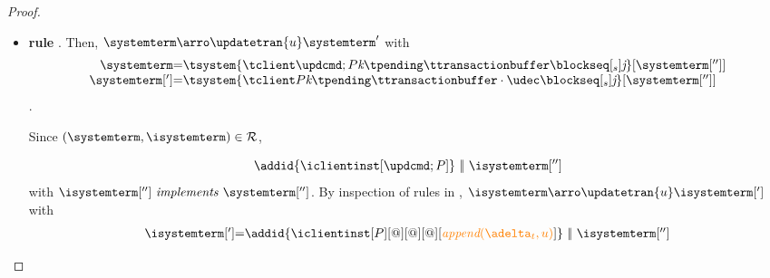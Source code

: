 \begin{proof}
\begin{itemize}
\begin{itemize}
\begin{enumerate}
						Then, we can build the following proof for 
						$\rvalue{r}{\flatten {\queuemessage[0..\tknown-1] \cdot \tpending} \cdot \ttransactionbuffer}
						= 
						\iapply{\known}{{\igetdeltas\pending}\cdot{\pushbuffer}\cdot{\transactionbuffer}}$
						\[
						  \mathrulean{\triangread}
						    {
								  \mathrulean{\lemref{lemma:apply}}
									{
										\mathrulean{\triangapply}
										{
										\known \triangleleft \flatten {\queuemessage[0..\tknown-1]}
										\quad 
										\mathrulean{\lemref{lemma:reduce}}
											{
												\ireduce{\igetdeltas{\pending}\cdot{\pushbuffer}} \triangleleft \flatten{\tpending}
												\quad
												\transactionbuffer \triangleleft \ttransactionbuffer
											}
											{\ireduce{{\igetdeltas\pending}\cdot{\pushbuffer}\cdot{\transactionbuffer}} 
											\triangleleft {\flatten {\tpending} \cdot \ttransactionbuffer}}
										}
										{\iapply{\known}{\ireduce{{\igetdeltas\pending}\cdot{\pushbuffer}\cdot{\transactionbuffer}}}
									\triangleleft {\flatten {\queuemessage[0..\tknown-1] \cdot \tpending} \cdot \ttransactionbuffer}}
									}
									{\iapply{\known}{{\igetdeltas\pending}\cdot{\pushbuffer}\cdot{\transactionbuffer}}  
									\triangleleft {\flatten {\queuemessage[0..\tknown-1] \cdot \tpending} \cdot \ttransactionbuffer}}
								}
  						  {v'  = v}  
					\]
											
						\item to 9 straightforwardly hold.
						

					\end{enumerate}
					
					
			\item {\bf rule }. Then, $\systemterm  \arroi{\updatetran{u}} \systemterm '$ with 
				\[\begin{array}{r@{=}l}
					\systemterm & \tsystem{\tclienti{\tupdateins}{\tknown}{\tpending}{\ttransactionbuffer}{\tsent}{\treceivebuffer}}[{\systemterm['']}]
					\\
					\systemterm['] & \tsystem{\tclienti{\tprogram}{\tknown}{\tpending}{\ttransactionbuffer \cdot \tupdate}{\tsent}{\treceivebuffer}}[{\systemterm['']}]	
				  \end{array}
				\]
				.
		
				Since $(\systemterm,\isystemterm)\in \mathcal{R}$,

				\[\addid{\iclientinst[\tupdateins]} \ \bigpar \ \isystemterm['']\]
				with $\implements{\isystemterm['']}{\systemterm['']}$. By inspection of rules in \figref{}, 
				$\isystemterm \arroi{\updatetran{u}} \isystemterm[']$ with
				\[\begin{array}{r@{=}l}
					\isystemterm['] & \addid{\iclientinst[P][@][@][@][\iappend{\transactionbuffer}{u}]} \ \bigpar \   \isystemterm['']	\\
				  \end{array}		
				\]
				

\end{itemize}
\end{itemize}
\end{proof}

